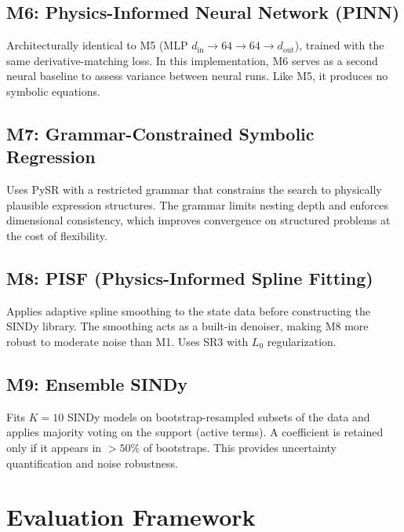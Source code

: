 \documentclass[conference]{IEEEtran}
\begin{document}
\subsection{M6: Physics-Informed Neural Network (PINN)}
Architecturally identical to M5 (MLP $d_\text{in} \to 64 \to 64 \to d_\text{out}$), trained with the same derivative-matching loss. In this implementation, M6 serves as a second neural baseline to assess variance between neural runs. Like M5, it produces no symbolic equations.

\subsection{M7: Grammar-Constrained Symbolic Regression}
Uses PySR with a restricted grammar that constrains the search to physically plausible expression structures. The grammar limits nesting depth and enforces dimensional consistency, which improves convergence on structured problems at the cost of flexibility.

\subsection{M8: PISF (Physics-Informed Spline Fitting)}
Applies adaptive spline smoothing to the state data before constructing the SINDy library. The smoothing acts as a built-in denoiser, making M8 more robust to moderate noise than M1. Uses SR3 with $L_0$ regularization.

\subsection{M9: Ensemble SINDy}
Fits $K = 10$ SINDy models on bootstrap-resampled subsets of the data and applies majority voting on the support (active terms). A coefficient is retained only if it appears in $>50\%$ of bootstraps. This provides uncertainty quantification and noise robustness.

\section{Evaluation Framework}
\label{sec:framework}
\end{document}
